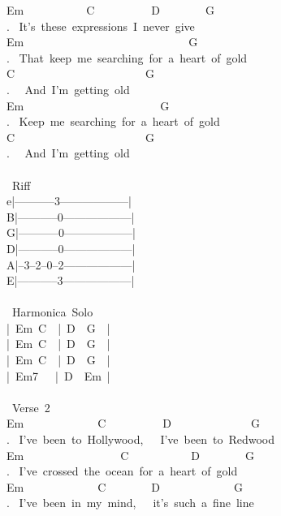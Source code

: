 {Em\ \ \ \ \ \ \ \ \ \ \ C\ \ \ \ \ \ \ \ \ \ D\ \ \ \ \ \ \ \ G\\
. \ It's\ these\ expressions\ I\ never\ give\\
Em\ \ \ \ \ \ \ \ \ \ \ \ \ \ \ \ \ \ \ \ \ \ \ \ \ \ \ \ \ G\\
. \ That\ keep\ me\ searching\ for\ a\ heart\ of\ gold\\
C\ \ \ \ \ \ \ \ \ \ \ \ \ \ \ \ \ \ \ \ \ \ \ G\\
. \ \ And\ I'm\ getting\ old\\
Em\ \ \ \ \ \ \ \ \ \ \ \ \ \ \ \ \ \ \ \ \ \ \ \ G\\
. \ Keep\ me\ searching\ for\ a\ heart\ of\ gold\\
C\ \ \ \ \ \ \ \ \ \ \ \ \ \ \ \ \ \ \ \ \ \ \ G\\
. \ \ And\ I'm\ getting\ old\\
\\
\lbrack\ Riff\rbrack\\
e|-----------3------------------|\\
B|-----------0------------------|\\
G|-----------0------------------|\\
D|-----------0------------------|\\
A|--3--2--0--2------------------|\\
E|-----------3------------------|\\
\\
\lbrack\ Harmonica\ Solo\rbrack\\
|\ Em\ C\ \ |\ D\ \ G\ \ |\\
|\ Em\ C\ \ |\ D\ \ G\ \ |\\
|\ Em\ C\ \ |\ D\ \ G\ \ |\\
|\ Em7\ \ \ |\ D\ \ Em\ |\\
\\
\lbrack\ Verse\ 2\rbrack\\
Em\ \ \ \ \ \ \ \ \ \ \ \ \ C\ \ \ \ \ \ \ \ \ \ D\ \ \ \ \ \ \ \ \ \ \ \ \ \ G\\
. \ I've\ been\ to\ Hollywood,\ \ \ I've\ been\ to\ Redwood\\
Em\ \ \ \ \ \ \ \ \ \ \ \ \ \ \ \ \ C\ \ \ \ \ \ \ \ \ \ \ D\ \ \ \ \ \ \ \ G\\
. \ I've\ crossed\ the\ ocean\ for\ a\ heart\ of\ gold\\
Em\ \ \ \ \ \ \ \ \ \ \ \ \ C\ \ \ \ \ \ \ \ D\ \ \ \ \ \ \ \ \ \ \ \ \ G\\
. \ I've\ been\ in\ my\ mind,\ \ \ it's\ such\ a\ fine\ line\\
}
